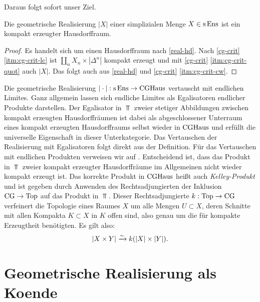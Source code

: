 Daraus folgt sofort unser Ziel.
\begin{kor}
  Die geometrische Realisierung $|X|$ einer simplizialen Menge $X \in
  \operatorname{s}\operatorname{Ens}$ ist ein kompakt erzeugter Hausdorffraum.
\end{kor}
\begin{proof}
  Es handelt sich um einen Hausdorffraum nach \ref{real-hd}. Nach
  \ref{cg-crit} \ref{itm:cg-crit-lc} ist $\coprod_n X_n \times
  |\Delta^n|$ kompakt erzeugt und mit \ref{cg-crit}
  \ref{itm:cg-crit-quot} auch $|X|$. Das folgt auch aus \ref{real-hd}
  und \ref{cg-crit} \ref{itm:cg-crit-cw}.
\end{proof}
\begin{bem} \label{real-products}
  Die geometrische Realisierung $|\cdot|: \operatorname{s}\operatorname{Ens} \to \operatorname{CGHaus}$
  vertauscht mit endlichen Limites. Ganz allgemein lassen sich
  endliche Limites als Egalisatoren endlicher Produkte darstellen. Der
  Egalisator in $\Top$ zweier stetiger Abbildungen zwischen kompakt
  erzeugten Hausdorffräumen ist dabei als abgeschlossener Unterraum
  eines kompakt erzeugten Hausdorffraums selbst wieder in $\operatorname{CGHaus}$
  und erfüllt die universelle Eigenschaft in dieser
  Unterkategorie. Das Vertauschen der Realisierung mit Egalisatoren
  folgt direkt aus der Definition. Für das Vertauschen mit endlichen
  Produkten verweisen wir auf \cite{Gabriel-Zisman}. Entscheidend ist,
  dass das Produkt in $\Top$ zweier kompakt erzeugter Hausdorffräume
  im Allgemeinen nicht wieder kompakt erzeugt ist. Das korrekte
  Produkt in $\operatorname{CGHaus}$ heißt auch \emph{Kelley-Produkt} und ist
  gegeben durch Anwenden des Rechtsadjungierten der Inklusion
  $\operatorname{CG} \to \operatorname{Top}$ auf das Produkt in $\Top$. Dieser Rechtsadjungierte
  $k: \operatorname{Top} \to \operatorname{CG}$ verfeinert die Topologie eines Raumes $X$ um alle
  Mengen $U \subset X$, deren Schnitte mit allen Kompakta $K \subset
  X$ in $K$ offen sind, also genau um die für kompakte Erzeugtheit
  benötigten. Es gilt also: \[ |X \times Y| \xrightarrow[]{\sim} k(|X| \times |Y|). \]
\end{bem}


\begin{bsp} \label{ex:cg-products}
\end{bsp}

\section{Geometrische Realisierung als Koende}

